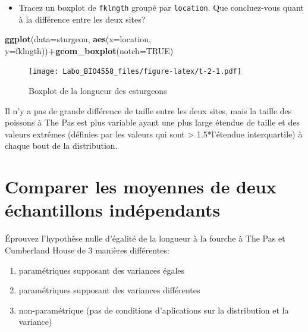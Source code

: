 \documentclass[12pt,]{book}
\newenvironment{Shaded}{\begin{snugshade}}{\end{snugshade}}
\newcommand{\DataTypeTok}[1]{\textcolor[rgb]{0.13,0.29,0.53}{#1}}
\newcommand{\KeywordTok}[1]{\textcolor[rgb]{0.13,0.29,0.53}{\textbf{#1}}}
\newcommand{\NormalTok}[1]{#1}
\newcommand{\OperatorTok}[1]{\textcolor[rgb]{0.81,0.36,0.00}{\textbf{#1}}}
\newcommand{\OtherTok}[1]{\textcolor[rgb]{0.56,0.35,0.01}{#1}}
\providecommand{\tightlist}{%
  \setlength{\itemsep}{0pt}\setlength{\parskip}{0pt}}
\begin{document}
\begin{itemize}
\tightlist
\item
  Tracez un boxplot de \texttt{fklngth} groupé par \texttt{location}. Que concluez-vous quant à la différence entre les deux sites?
\end{itemize}

\begin{Shaded}
\begin{Highlighting}[]
\KeywordTok{ggplot}\NormalTok{(}\DataTypeTok{data=}\NormalTok{sturgeon, }\KeywordTok{aes}\NormalTok{(}\DataTypeTok{x=}\NormalTok{location,}
\DataTypeTok{y=}\NormalTok{fklngth))}\OperatorTok{+}\KeywordTok{geom_boxplot}\NormalTok{(}\DataTypeTok{notch=}\OtherTok{TRUE}\NormalTok{)}
\end{Highlighting}
\end{Shaded}

\begin{figure}
\centering
\texttt{[image: Labo\_BIO4558\_files/figure-latex/t-2-1.pdf]}
\caption{\label{fig:t-2}Boxplot de la longueur des esturgeons}
\end{figure}

Il n'y a pas de grande différence de taille entre les deux sites, mais la taille des poissons à The Pas est plus variable ayant une plus large étendue de taille et des valeurs extrêmes (définies par les valeurs qui sont \textgreater{} 1.5*l'étendue interquartile) à chaque bout de la distribution.

\hypertarget{comparer-les-moyennes-de-deux-uxe9chantillons-induxe9pendants}{%
\section{Comparer les moyennes de deux échantillons indépendants}\label{comparer-les-moyennes-de-deux-uxe9chantillons-induxe9pendants}}

Éprouvez l'hypothèse nulle d'égalité de la longueur à la fourche à The Pas et Cumberland House de 3 manières différentes:

\begin{enumerate}
\def\labelenumi{\arabic{enumi}.}
\tightlist
\item
  paramétriques supposant des variances égales
\item
  paramétriques supposant des variances différentes
\item
  non-paramétrique (pas de conditions d'aplications sur la distribution et la variance)
\end{enumerate}
\end{document}

